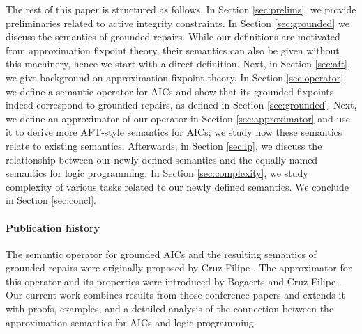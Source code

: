 \documentclass[runningheads]{llncs}
\begin{document}
The rest of this paper is structured as follows. In Section \ref{sec:prelims}, we provide preliminaries related to active integrity constraints. 
In Section \ref{sec:grounded} we discuss the semantics of grounded repairs. While our definitions are motivated from approximation fixpoint theory, their semantics can also be given without this machinery, hence we start with a direct definition. 
Next, in Section \ref{sec:aft}, we give background on approximation fixpoint theory. 
In Section \ref{sec:operator}, we define a semantic operator for AICs and show that its grounded fixpoints indeed correspond to grounded repairs, as defined in Section \ref{sec:grounded}.
Next, we define an approximator of our operator in Section \ref{sec:approximator} and use it to derive more AFT-style semantics for AICs; we study how these semantics relate to existing semantics. 
Afterwards, in Section \ref{sec:lp}, we discuss the relationship between our newly defined semantics and the equally-named semantics for logic programming. 
In Section \ref{sec:complexity}, we study complexity of various tasks related to our newly defined semantics. We conclude in Section \ref{sec:concl}.


\paragraph{Publication history}
The semantic operator for grounded AICs and the resulting semantics of grounded repairs were originally proposed by Cruz-Filipe \cite{iclp/Cruz-Filipe16}.
The approximator for this operator and its properties were introduced by Bogaerts and Cruz-Filipe \cite{ijcai/BogaertsC17}.
Our current work combines results from those conference papers and extends it with proofs, examples, and a detailed analysis of the connection between the approximation semantics for AICs and logic programming.

\end{document}
